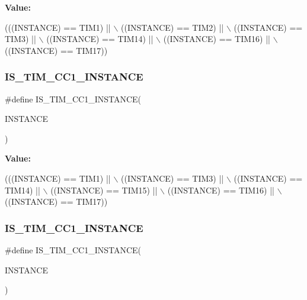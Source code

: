 {\bfseries Value\+:}
\begin{DoxyCode}
(((INSTANCE) == TIM1)    || \(\backslash\)
   ((INSTANCE) == TIM2)    || \(\backslash\)
   ((INSTANCE) == TIM3)    || \(\backslash\)
   ((INSTANCE) == TIM14)   || \(\backslash\)
   ((INSTANCE) == TIM16)   || \(\backslash\)
   ((INSTANCE) == TIM17))
\end{DoxyCode}
\mbox{\label{group___exported__macro_ga0c02efc77b1bfb640d7f6593f58ad464}} 
\subsubsection{\texorpdfstring{I\+S\+\_\+\+T\+I\+M\+\_\+\+C\+C1\+\_\+\+I\+N\+S\+T\+A\+N\+CE}{IS\_TIM\_CC1\_INSTANCE}\hspace{0.1cm}{\footnotesize\ttfamily [6/16]}}
{\footnotesize\ttfamily \#define I\+S\+\_\+\+T\+I\+M\+\_\+\+C\+C1\+\_\+\+I\+N\+S\+T\+A\+N\+CE(\begin{DoxyParamCaption}\item[{}]{I\+N\+S\+T\+A\+N\+CE }\end{DoxyParamCaption})}

{\bfseries Value\+:}
\begin{DoxyCode}
(((INSTANCE) == TIM1)    || \(\backslash\)
   ((INSTANCE) == TIM3)    || \(\backslash\)
   ((INSTANCE) == TIM14)   || \(\backslash\)
   ((INSTANCE) == TIM15)   || \(\backslash\)
   ((INSTANCE) == TIM16)   || \(\backslash\)
   ((INSTANCE) == TIM17))
\end{DoxyCode}
\mbox{\label{group___exported__macro_ga0c02efc77b1bfb640d7f6593f58ad464}} 
\subsubsection{\texorpdfstring{I\+S\+\_\+\+T\+I\+M\+\_\+\+C\+C1\+\_\+\+I\+N\+S\+T\+A\+N\+CE}{IS\_TIM\_CC1\_INSTANCE}\hspace{0.1cm}{\footnotesize\ttfamily [7/16]}}
{\footnotesize\ttfamily \#define I\+S\+\_\+\+T\+I\+M\+\_\+\+C\+C1\+\_\+\+I\+N\+S\+T\+A\+N\+CE(\begin{DoxyParamCaption}\item[{}]{I\+N\+S\+T\+A\+N\+CE }\end{DoxyParamCaption})}

